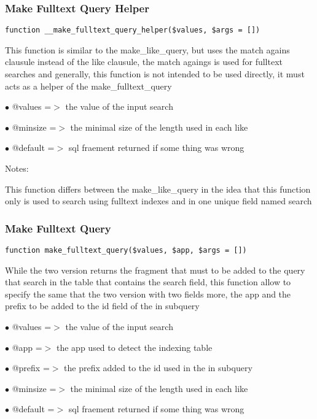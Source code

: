 \documentclass[a4paper]{article}
\begin{document}
\hypertarget{toc231}{}
\subsubsection{Make Fulltext Query Helper}

\begin{lstlisting}
function __make_fulltext_query_helper($values, $args = [])
\end{lstlisting}

This function is similar to the make\_like\_query, but uses the match agains
clausule instead of the like clausule, the match agaings is used for
fulltext searches and generally, this function is not intended to be used
directly, it must acts as a helper of the make\_fulltext\_query

\begin{compactitem}
\item[\color{myblue}$\bullet$] @values  =$>$ the value of the input search
\item[\color{myblue}$\bullet$] @minsize =$>$ the minimal size of the length used in each like
\item[\color{myblue}$\bullet$] @default =$>$ sql fraement returned if some thing was wrong
\end{compactitem}

Notes:

This function differs between the make\_like\_query in the idea that this
function only is used to search using fulltext indexes and in one unique
field named search

\hypertarget{toc232}{}
\subsubsection{Make Fulltext Query}

\begin{lstlisting}
function make_fulltext_query($values, $app, $args = [])
\end{lstlisting}

While the two version returns the fragment that must to be added to the
query that search in the table that contains the search field, this function
allow to specify the same that the two version with two fields more, the
app and the prefix to be added to the id field of the in subquery

\begin{compactitem}
\item[\color{myblue}$\bullet$] @values  =$>$ the value of the input search
\item[\color{myblue}$\bullet$] @app     =$>$ the app used to detect the indexing table
\item[\color{myblue}$\bullet$] @prefix  =$>$ the prefix added to the id used in the in subquery
\item[\color{myblue}$\bullet$] @minsize =$>$ the minimal size of the length used in each like
\item[\color{myblue}$\bullet$] @default =$>$ sql fraement returned if some thing was wrong
\end{compactitem}
\end{document}
